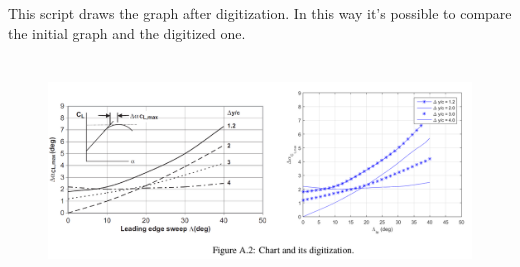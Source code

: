 \noindent \\ \\ 
This script draws the graph after digitization. In this way it's possible to compare the initial graph and the digitized one.


 \begin{figure}[H]
\centering
{\includegraphics[height=6cm]{Immagini/digitize2.png}} 
\label{angles}
\end{figure} 



